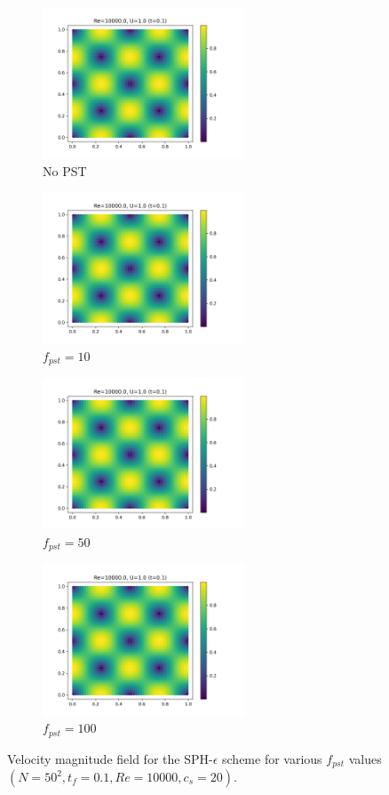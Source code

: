 \begin{figure}[htbp!]
  \begin{subfigure}{7cm}
  \centering\includegraphics[width=6cm]{Code-Figures/mon2017/pst/c0_20_tait_pec_dtmul_1_nx_50_pst_-1_re_10000_mon2017/final_vmag.png}
  \caption{No PST}
  \end{subfigure}
  \begin{subfigure}{7cm}
  \centering\includegraphics[width=6cm]{Code-Figures/mon2017/pst/c0_20_tait_pec_dtmul_1_nx_50_pst_10_re_10000_mon2017/final_vmag.png}
  \caption{$f_{pst} = 10$}
  \end{subfigure}
  \begin{subfigure}{7cm}
  \centering\includegraphics[width=6cm]{Code-Figures/mon2017/pst/c0_20_tait_pec_dtmul_1_nx_50_pst_50_re_10000_mon2017/final_vmag.png}
  \caption{$f_{pst} = 50$}
  \end{subfigure}
  \begin{subfigure}{7cm}
  \centering\includegraphics[width=6cm]{Code-Figures/mon2017/pst/c0_20_tait_pec_dtmul_1_nx_50_pst_100_re_10000_mon2017/final_vmag.png}
  \caption{$f_{pst} = 100$}
  \end{subfigure}
  \caption{Velocity magnitude field for the SPH-$\epsilon$ scheme for various $f_{pst}$ values $(N=50^2, t_f=0.1, Re=10000, c_s=20)$.}
  \label{fig:sph-eps-pst-vmag}
\end{figure}

